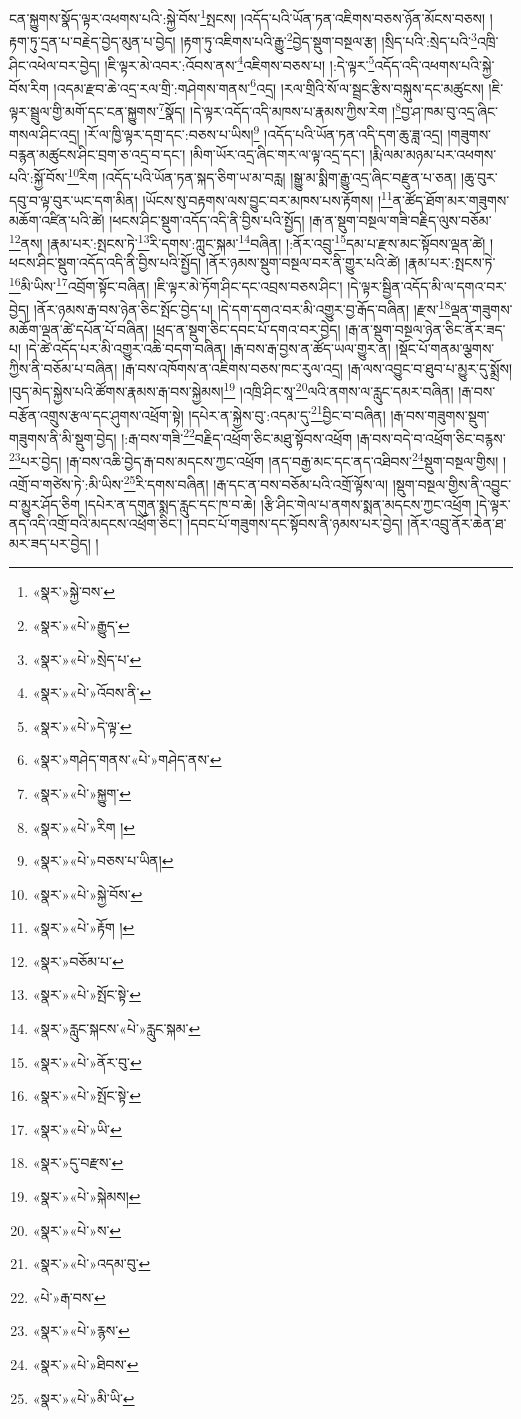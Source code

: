 ངན་སྐྱུགས་སྣོད་ལྟར་འཕགས་པའི་:སྐྱེ་བོས་\footnote{«སྣར་»སྐྱེ་བས་}སྤངས། །འདོད་པའི་ཡོན་ཏན་འཇིགས་བཅས་ཉོན་མོངས་བཅས། །རྟག་ཏུ་དྲན་པ་བརྗེད་བྱེད་མུན་པ་བྱེད། །རྟག་ཏུ་འཇིགས་པའི་རྒྱུ་\footnote{«སྣར་»«པེ་»རྒྱུད་}བྱེད་སྡུག་བསྔལ་རྩ། །སྲིད་པའི་:སྲེད་པའི་\footnote{«སྣར་»«པེ་»སྲེད་པ་}འཁྲི་ཤིང་འཕེལ་བར་བྱེད། །ཇི་ལྟར་མེ་འབར་:འོབས་ནས་\footnote{«སྣར་»«པེ་»འོབས་ནི་}འཇིགས་བཅས་པ། །:དེ་ལྟར་\footnote{«སྣར་»«པེ་»དེ་ལྟ་}འདོད་འདི་འཕགས་པའི་སྐྱེ་བོས་རིག །འདམ་རྫབ་ཆེ་འདྲ་རལ་གྲི་:གཤེགས་གནས་\footnote{«སྣར་»གཤེད་གནས་«པེ་»གཤེད་ནས་}འདྲ། །རལ་གྲིའི་སོ་ལ་སྦྲང་རྩིས་བསྐུས་དང་མཚུངས། །ཇི་ལྟར་སྦྲུལ་གྱི་མགོ་དང་ངན་སྐྱུགས་\footnote{«སྣར་»«པེ་»སྐྱུག་}སྣོད། །དེ་ལྟར་འདོད་འདི་མཁས་པ་རྣམས་ཀྱིས་རེག །\footnote{«སྣར་»«པེ་»རིག །}བྱ་ཤ་ཁམ་བུ་འདྲ་ཞིང་གསལ་ཤིང་འདྲ། །རོ་ལ་ཁྱི་ལྟར་དགྲ་དང་:བཅས་པ་ཡིས།\footnote{«སྣར་»«པེ་»བཅས་པ་ཡིན།} །འདོད་པའི་ཡོན་ཏན་འདི་དག་ཆུ་ཟླ་འདྲ། །གཟུགས་བརྙན་མཚུངས་ཤིང་བྲག་ཅ་འདྲ་བ་དང་། །མིག་ཡོར་འདྲ་ཞིང་གར་ལ་ལྟ་འདྲ་དང་། །རྨི་ལམ་མཉམ་པར་འཕགས་པའི་:སྐྱོ་བོས་\footnote{«སྣར་»«པེ་»སྐྱེ་བོས་}རིག །འདོད་པའི་ཡོན་ཏན་སྐད་ཅིག་ཡ་མ་བརླ། །སྒྱུ་མ་སྨིག་རྒྱུ་འདྲ་ཞིང་བརྫུན་པ་ཅན། །ཆུ་བུར་དབུ་བ་ལྟ་བུར་ཡང་དག་མིན། །ཡོངས་སུ་བརྟགས་ལས་བྱུང་བར་མཁས་པས་རྟོགས། །\footnote{«སྣར་»«པེ་»རྟོག །}ན་ཚོད་ཐོག་མར་གཟུགས་མཆོག་འཛིན་པའི་ཚེ། །ཕངས་ཤིང་སྡུག་འདོད་འདི་ནི་བྱིས་པའི་སྤྱོད། །རྒ་ན་སྡུག་བསྔལ་གཟི་བརྗིད་ལུས་བཅོམ་\footnote{«སྣར་»བཅོམ་པ་}ནས། །རྣམ་པར་:སྤངས་ཏེ་\footnote{«སྣར་»«པེ་»སྤོང་སྟེ་}རི་དགས་:ཀླུང་སྐམ་\footnote{«སྣར་»རླུང་སྐངས་«པེ་»རླུང་སྐམ་}བཞིན། །:ནོར་འབྲུ་\footnote{«སྣར་»«པེ་»ནོར་བུ་}དམ་པ་རྫས་མང་སྟོབས་ལྡན་ཚེ། །ཕངས་ཤིང་སྡུག་འདོད་འདི་ནི་བྱིས་པའི་སྤྱོད། །ནོར་ཉམས་སྡུག་བསྔལ་བར་ནི་གྱུར་པའི་ཚེ། །རྣམ་པར་:སྤངས་ཏེ་\footnote{«སྣར་»«པེ་»སྤོང་སྟེ་}མི་ཡིས་\footnote{«སྣར་»«པེ་»ཡི་}འབྲོག་སྟོང་བཞིན། །ཇི་ལྟར་མེ་ཏོག་ཤིང་དང་འབྲས་བཅས་ཤིང་། །དེ་ལྟར་སྦྱིན་འདོད་མི་ལ་དགའ་བར་བྱེད། །ནོར་ཉམས་རྒ་བས་ཉེན་ཅིང་སྤོང་བྱེད་པ། །དེ་དག་དགའ་བར་མི་འགྱུར་བྱ་རྒོད་བཞིན། །རྫས་\footnote{«སྣར་»དུ་བརྫས་}ལྡན་གཟུགས་མཆོག་ལྡན་ཚེ་དཔོན་པོ་བཞིན། །ཕྲད་ན་སྡུག་ཅིང་དབང་པོ་དགའ་བར་བྱེད། །རྒ་ན་སྡུག་བསྔལ་ཉེན་ཅིང་ནོར་ཟད་པ། །དེ་ཚེ་འདོད་པར་མི་འགྱུར་འཆི་བདག་བཞིན། །རྒ་བས་རྒ་བྱས་ན་ཚོད་ཡལ་གྱུར་ན། །སྡོང་པོ་གནམ་ལྕགས་ཀྱིས་ནི་བཅོམ་པ་བཞིན། །རྒ་བས་འཁོགས་ན་འཇིགས་བཅས་ཁང་རུལ་འདྲ། །རྒ་ལས་འབྱུང་བ་ཐུབ་པ་མྱུར་དུ་སྨྲོས། །བུད་མེད་སྐྱེས་པའི་ཚོགས་རྣམས་རྒ་བས་སྐྱེམས།\footnote{«སྣར་»«པེ་»སྐེམས།} །འཁྲི་ཤིང་སཱ་\footnote{«སྣར་»«པེ་»ས་}ལའི་ནགས་ལ་རླུང་དམར་བཞིན། །རྒ་བས་བརྩོན་འགྲུས་རྩལ་དང་ཤུགས་འཕྲོག་སྟེ། །དཔེར་ན་སྐྱེས་བུ་:འདམ་དུ་\footnote{«སྣར་»«པེ་»འདམ་བུ་}བྱིང་བ་བཞིན། །རྒ་བས་གཟུགས་སྡུག་གཟུགས་ནི་མི་སྡུག་བྱེད། །:རྒ་བས་གཟི་\footnote{«པེ་»རྒ་བས་}བརྗིད་འཕྲོག་ཅིང་མཐུ་སྟོབས་འཕྲོག །རྒ་བས་བདེ་བ་འཕྲོག་ཅིང་བརྙས་\footnote{«སྣར་»«པེ་»རྙས་}པར་བྱེད། །རྒ་བས་འཆི་བྱེད་རྒ་བས་མདངས་ཀྱང་འཕྲོག །ནད་བརྒྱ་མང་དང་ནད་འཐིབས་\footnote{«སྣར་»«པེ་»ཐིབས་}སྡུག་བསྔལ་གྱིས། །འགྲོ་བ་གཙེས་ཏེ་:མི་ཡིས་\footnote{«སྣར་»«པེ་»མི་ཡི་}རི་དགས་བཞིན། །རྒ་དང་ན་བས་བཅོམ་པའི་འགྲོ་ལྟོས་ལ། །སྡུག་བསྔལ་གྱིས་ནི་འབྱུང་བ་མྱུར་ཤོད་ཅིག །དཔེར་ན་དགུན་སྨད་རླུང་དང་ཁ་བ་ཆེ། །རྩི་ཤིང་གེལ་པ་ནགས་སྨན་མདངས་ཀྱང་འཕྲོག །དེ་ལྟར་ནད་འདི་འགྲོ་བའི་མདངས་འཕྲོག་ཅིང་། །དབང་པོ་གཟུགས་དང་སྟོབས་ནི་ཉམས་པར་བྱེད། །ནོར་འབྲུ་ནོར་ཆེན་ཐ་མར་ཟད་པར་བྱེད། །
